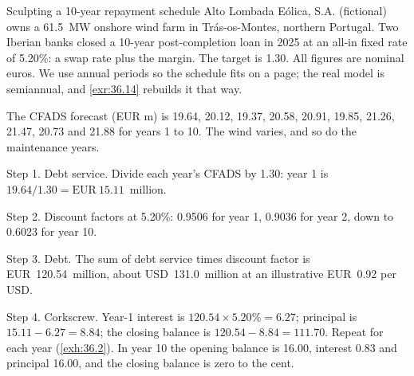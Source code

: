 \begin{example}{Sculpting a 10-year repayment schedule \illustrative}\label{ex:36.3}
Alto Lombada Eólica, S.A. (fictional) owns a 61.5~MW onshore wind farm in Trás-os-Montes, northern Portugal. Two Iberian banks closed a 10-year post-completion loan in 2025 at an all-in fixed rate of 5.20\%: a swap rate plus the margin. The target is 1.30\x. All figures are nominal euros. We use annual periods so the schedule fits on a page; the real model is semiannual, and \cref{exr:36.14} rebuilds it that way.

The CFADS forecast (EUR m) is 19.64, 20.12, 19.37, 20.58, 20.91, 19.85, 21.26, 21.47, 20.73 and 21.88 for years 1 to 10. The wind varies, and so do the maintenance years.

Step 1. Debt service. Divide each year's CFADS by 1.30: year 1 is $19.64/1.30 = \mathrm{EUR}~15.11$~million.

Step 2. Discount factors at 5.20\%: 0.9506 for year 1, 0.9036 for year 2, down to 0.6023 for year 10.

Step 3. Debt. The sum of debt service times discount factor is EUR~120.54~million, about USD~131.0~million at an illustrative EUR~0.92 per USD.

Step 4. Corkscrew. Year-1 interest is $120.54 \times 5.20\% = 6.27$; principal is $15.11 - 6.27 = 8.84$; the closing balance is $120.54 - 8.84 = 111.70$. Repeat for each year (\cref{exh:36.2}). In year 10 the opening balance is 16.00, interest 0.83 and principal 16.00, and the closing balance is zero to the cent.
\end{example}

